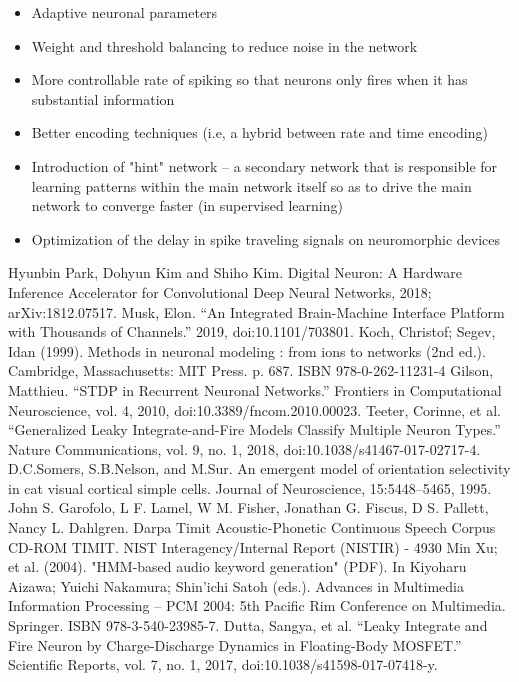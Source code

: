 \documentclass[11pt]{article}  %
\begin{document}
\begin{itemize}
	\item Adaptive neuronal parameters
	\item Weight and threshold balancing to reduce noise in the network
	\item More controllable rate of spiking so that neurons only fires when it has substantial information
	\item Better encoding techniques (i.e, a hybrid between rate and time encoding)
	\item Introduction of "hint" network -- a secondary network that is responsible for learning patterns within the main network itself so as to drive the main network to converge faster (in supervised learning)
	\item Optimization of the delay in spike traveling signals on neuromorphic devices
\end{itemize}

\newpage

\begin{thebibliography}{00}
	 Hyunbin Park, Dohyun Kim and Shiho Kim.
	\newblock Digital Neuron: A Hardware Inference Accelerator for Convolutional Deep Neural Networks, 2018;
	\newblock arXiv:1812.07517.
	 Musk, Elon. “An Integrated Brain-Machine Interface Platform with Thousands of Channels.” 2019, doi:10.1101/703801.
	 Koch, Christof; Segev, Idan (1999). Methods in neuronal modeling : from ions to networks (2nd ed.). Cambridge, Massachusetts: MIT Press. p. 687. ISBN 978-0-262-11231-4
	 Gilson, Matthieu. “STDP in Recurrent Neuronal Networks.” Frontiers in Computational Neuroscience, vol. 4, 2010, doi:10.3389/fncom.2010.00023.
	 Teeter, Corinne, et al. “Generalized Leaky Integrate-and-Fire Models Classify Multiple Neuron Types.” Nature Communications, vol. 9, no. 1, 2018, doi:10.1038/s41467-017-02717-4.
	 D.C.Somers, S.B.Nelson, and M.Sur. An emergent model of orientation selectivity in cat visual cortical simple cells. Journal of Neuroscience, 15:5448–5465, 1995.
	 John S. Garofolo, L F. Lamel, W M. Fisher, Jonathan G. Fiscus, D S. Pallett, Nancy L. Dahlgren. Darpa Timit Acoustic-Phonetic Continuous Speech Corpus CD-ROM {TIMIT}. NIST Interagency/Internal Report (NISTIR) - 4930
	 Min Xu; et al. (2004). "HMM-based audio keyword generation" (PDF). In Kiyoharu Aizawa; Yuichi Nakamura; Shin'ichi Satoh (eds.). Advances in Multimedia Information Processing – PCM 2004: 5th Pacific Rim Conference on Multimedia. Springer. ISBN 978-3-540-23985-7. 
	 Dutta, Sangya, et al. “Leaky Integrate and Fire Neuron by Charge-Discharge Dynamics in Floating-Body MOSFET.” Scientific Reports, vol. 7, no. 1, 2017, doi:10.1038/s41598-017-07418-y.
\end{thebibliography}
\end{document}
